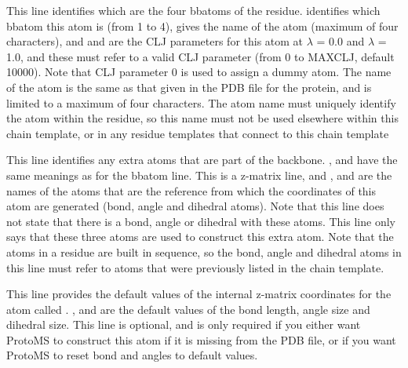 \documentclass[letterpaper,10pt,english]{sphinxmanual}
\begin{document}
This line identifies which are the four bbatoms of the residue.  identifies which bbatom this atom is (from 1 to 4),  gives the name of the atom (maximum of four characters), and  and  are the CLJ parameters for this atom at \(\lambda\) = 0.0 and \(\lambda\) = 1.0, and these must refer to a valid CLJ parameter (from 0 to MAXCLJ, default 10000). Note that CLJ parameter 0 is used to assign a dummy atom. The name of the atom is the same as that given in the PDB file for the protein, and is limited to a maximum of four characters. The atom name must uniquely identify the atom within the residue, so this name must not be used elsewhere within this chain template, or in any residue templates that connect to this chain template

%
\begin{sphinxVerbatim}[commandchars=\\\{\}]
      
\end{sphinxVerbatim}

This line identifies any extra atoms that are part of the backbone. ,  and  have the same meanings as for the bbatom line. This is a z-matrix line, and ,  and  are the names of the atoms that are the reference from which the coordinates of this atom are generated (bond, angle and dihedral atoms). Note that this line does not state that there is a bond, angle or dihedral with these atoms. This line only says that these three atoms are used to construct this extra atom. Note that the atoms in a residue are built in sequence, so the bond, angle and dihedral atoms in this line must refer to atoms that were previously listed in the chain template.

%
\begin{sphinxVerbatim}[commandchars=\\\{\}]
    
\end{sphinxVerbatim}

This line provides the default values of the internal z-matrix coordinates for the atom called . ,  and  are the default values of the bond length, angle size and dihedral size. This line is optional, and is only required if you either want ProtoMS to construct this atom if it is missing from the PDB file, or if you want ProtoMS to reset bond and angles to default values.
\end{document}
